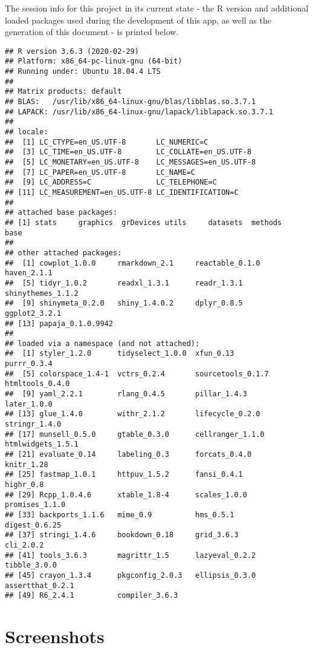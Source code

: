 \documentclass[english,man,floatsintext]{apa6}
\begin{document}
The session info for this project in its current state - the R version and additional loaded packages used during the development of this app, as well as the generation of this document - is printed below.

\begin{verbatim}
## R version 3.6.3 (2020-02-29)
## Platform: x86_64-pc-linux-gnu (64-bit)
## Running under: Ubuntu 18.04.4 LTS
## 
## Matrix products: default
## BLAS:   /usr/lib/x86_64-linux-gnu/blas/libblas.so.3.7.1
## LAPACK: /usr/lib/x86_64-linux-gnu/lapack/liblapack.so.3.7.1
## 
## locale:
##  [1] LC_CTYPE=en_US.UTF-8       LC_NUMERIC=C              
##  [3] LC_TIME=en_US.UTF-8        LC_COLLATE=en_US.UTF-8    
##  [5] LC_MONETARY=en_US.UTF-8    LC_MESSAGES=en_US.UTF-8   
##  [7] LC_PAPER=en_US.UTF-8       LC_NAME=C                 
##  [9] LC_ADDRESS=C               LC_TELEPHONE=C            
## [11] LC_MEASUREMENT=en_US.UTF-8 LC_IDENTIFICATION=C       
## 
## attached base packages:
## [1] stats     graphics  grDevices utils     datasets  methods   base     
## 
## other attached packages:
##  [1] cowplot_1.0.0     rmarkdown_2.1     reactable_0.1.0   haven_2.1.1      
##  [5] tidyr_1.0.2       readxl_1.3.1      readr_1.3.1       shinythemes_1.1.2
##  [9] shinymeta_0.2.0   shiny_1.4.0.2     dplyr_0.8.5       ggplot2_3.2.1    
## [13] papaja_0.1.0.9942
## 
## loaded via a namespace (and not attached):
##  [1] styler_1.2.0      tidyselect_1.0.0  xfun_0.13         purrr_0.3.4      
##  [5] colorspace_1.4-1  vctrs_0.2.4       sourcetools_0.1.7 htmltools_0.4.0  
##  [9] yaml_2.2.1        rlang_0.4.5       pillar_1.4.3      later_1.0.0      
## [13] glue_1.4.0        withr_2.1.2       lifecycle_0.2.0   stringr_1.4.0    
## [17] munsell_0.5.0     gtable_0.3.0      cellranger_1.1.0  htmlwidgets_1.5.1
## [21] evaluate_0.14     labeling_0.3      forcats_0.4.0     knitr_1.28       
## [25] fastmap_1.0.1     httpuv_1.5.2      fansi_0.4.1       highr_0.8        
## [29] Rcpp_1.0.4.6      xtable_1.8-4      scales_1.0.0      promises_1.1.0   
## [33] backports_1.1.6   mime_0.9          hms_0.5.1         digest_0.6.25    
## [37] stringi_1.4.6     bookdown_0.18     grid_3.6.3        cli_2.0.2        
## [41] tools_3.6.3       magrittr_1.5      lazyeval_0.2.2    tibble_3.0.0     
## [45] crayon_1.3.4      pkgconfig_2.0.3   ellipsis_0.3.0    assertthat_0.2.1 
## [49] R6_2.4.1          compiler_3.6.3
\end{verbatim}

\newpage

\hypertarget{screenshots}{%
\section{Screenshots}\label{screenshots}}
\end{document}
